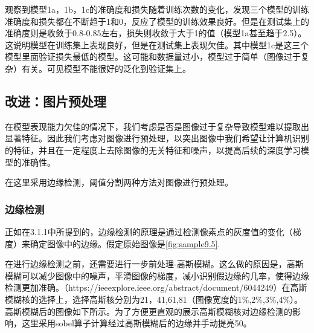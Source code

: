 观察到模型1a，1b，1c的准确度和损失随着训练次数的变化，发现三个模型的训练准确度和损失都在不断趋于1和0，反应了模型的训练效果良好。但是在测试集上的准确度则是收敛于0.8-0.85左右，损失则收敛于大于1的值（模型1a甚至趋于2.5）。这说明模型在训练集上表现良好，但是在测试集上表现欠佳。其中模型1c是这三个模型里面验证损失最低的模型。这可能和数据量过小，模型过于简单（图像过于复杂）有关。可见模型不能很好的泛化到验证集上。



\FloatBarrier


\subsection{改进：图片预处理}

在模型表现能力欠佳的情况下，我们考虑是否是图像过于复杂导致模型难以提取出显著特征。因此我们考虑对图像进行预处理，以突出图像中我们希望让计算机识别的特征，并且在一定程度上去除图像的无关特征和噪声，以提高后续的深度学习模型的准确性。


在这里采用边缘检测，阈值分割两种方法对图像进行预处理。


\subsubsection{边缘检测}

正如在3.1.1中所提到的，边缘检测的原理是通过检测像素点的灰度值的变化（梯度）来确定图像中的边缘。假定原始图像是\autoref{fig:sample9.5}.

在进行边缘检测之前，还需要进行一步前处理-高斯模糊。这么做的原因是，高斯模糊可以减少图像中的噪声，平滑图像的梯度，减小识别假边缘的几率，使得边缘检测更加准确。（https://ieeexplore.ieee.org/abstract/document/6044249）在高斯模糊核的选择上，选择高斯核分别为21，41,61,81（图像宽度的1\%,2\%,3\%,4\%）。
高斯模糊后的图像如下所示。为了方便更直观的展示高斯模糊核对边缘检测的影响，这里采用sobel算子计算经过高斯模糊后的边缘并手动提亮50。

